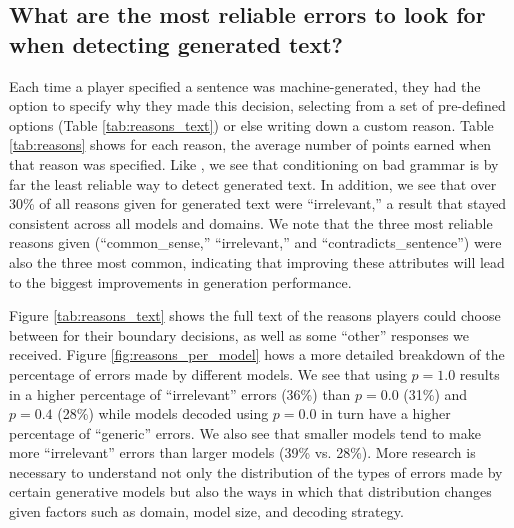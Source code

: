 \subsection{What are the most reliable errors to look for when detecting generated text?}
\label{sec:reasons}
Each time a player specified a sentence was machine-generated, they had the option to specify why they made this decision, selecting from a set of pre-defined options (Table \ref{tab:reasons_text}) or else writing down a custom reason.
Table \ref{tab:reasons} shows for each reason, the average number of points earned when that reason was specified.
Like \citet{clark2021all}, we see that conditioning on bad grammar is by far the least reliable way to detect generated text.
In addition, we see that over 30\% of all reasons given for generated text were ``irrelevant,'' a result that stayed consistent across all models and domains.
We note that the three most reliable reasons given (``common\_sense,'' ``irrelevant,'' and ``contradicts\_sentence'') were also the three most common, indicating that improving these attributes will lead to the biggest improvements in generation performance.

Figure \ref{tab:reasons_text} shows the full text of the reasons players could choose between for their boundary decisions, as well as some ``other'' responses we received. 
Figure \ref{fig:reasons_per_model} hows a more detailed breakdown of the percentage of errors made by different models. We see that using $p=1.0$ results in a higher percentage of ``irrelevant'' errors (36\%) than $p=0.0$ (31\%) and $p=0.4$ (28\%) while models decoded using $p=0.0$ in turn have a higher percentage of ``generic'' errors. We also see that smaller models tend to make more ``irrelevant'' errors than larger models (39\% vs. 28\%).
More research is necessary to understand not only the distribution of the types of errors made by certain generative models but also the ways in which that distribution changes given factors such as domain, model size, and decoding strategy.

